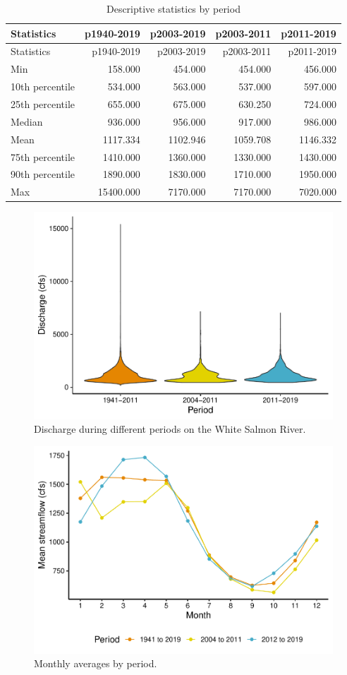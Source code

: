 \documentclass[
  12pt,
]{article}
\begin{document}
\newpage

\begin{longtable}[]{@{}lrrrr@{}}
\caption{Descriptive statistics by period}\tabularnewline
\toprule
Statistics & p1940-2019 & p2003-2019 & p2003-2011 &
p2011-2019\tabularnewline
\midrule
\endfirsthead
\toprule
Statistics & p1940-2019 & p2003-2019 & p2003-2011 &
p2011-2019\tabularnewline
\midrule
\endhead
Min & 158.000 & 454.000 & 454.000 & 456.000\tabularnewline
10th percentile & 534.000 & 563.000 & 537.000 & 597.000\tabularnewline
25th percentile & 655.000 & 675.000 & 630.250 & 724.000\tabularnewline
Median & 936.000 & 956.000 & 917.000 & 986.000\tabularnewline
Mean & 1117.334 & 1102.946 & 1059.708 & 1146.332\tabularnewline
75th percentile & 1410.000 & 1360.000 & 1330.000 &
1430.000\tabularnewline
90th percentile & 1890.000 & 1830.000 & 1710.000 &
1950.000\tabularnewline
Max & 15400.000 & 7170.000 & 7170.000 & 7020.000\tabularnewline
\bottomrule
\end{longtable}

\begin{figure}
\centering
\includegraphics{WhiteSalmon_WriteUp_files/figure-latex/fig3-1.pdf}
\caption{Discharge during different periods on the White Salmon River.}
\end{figure}

\newpage

\begin{figure}
\centering
\includegraphics{WhiteSalmon_WriteUp_files/figure-latex/fig4-1.pdf}
\caption{Monthly averages by period.}
\end{figure}
\end{document}

